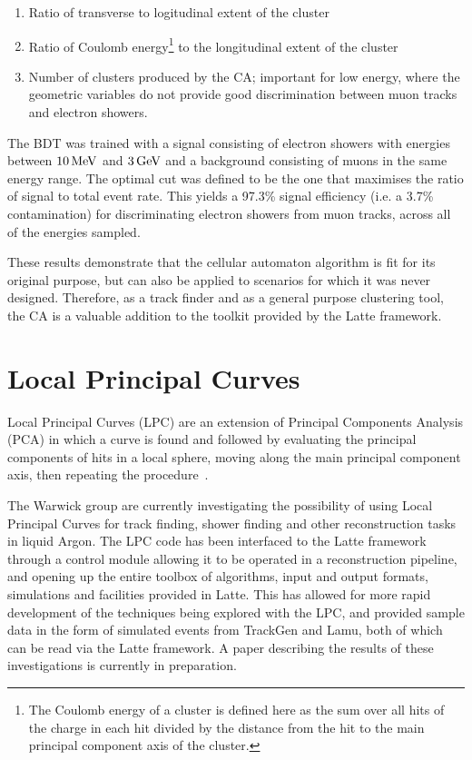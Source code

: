 \begin{enumerate}
    \item Ratio of transverse to logitudinal extent of the cluster
    \item Ratio of Coulomb energy\footnote{The Coulomb energy of a cluster is defined here as the sum over all hits of the charge in each hit divided by the distance from the hit to the main principal component axis of the cluster.} to the longitudinal extent of the cluster
    \item Number of clusters produced by the CA; important for low energy, where the geometric variables do not provide good discrimination between muon tracks and electron showers.
\end{enumerate}

The BDT was trained with a signal consisting of electron showers with energies between $10\,\mathrm{MeV}$ and $3\,\mathrm{GeV}$ and a background consisting of muons in the same energy range. The optimal cut was defined to be the one that maximises the ratio of signal to total event rate. This yields a 97.3\% signal efficiency (i.e. a 3.7\% contamination) for discriminating electron showers from muon tracks, across all of the energies sampled.

These results demonstrate that the cellular automaton algorithm is fit for its original purpose, but can also be applied to scenarios for which it was never designed. Therefore, as a track finder and as a general purpose clustering tool, the CA is a valuable addition to the toolkit provided by the Latte framework.

\section{Local Principal Curves}
Local Principal Curves (LPC) are an extension of Principal Components Analysis (PCA) in which a curve is found and followed by evaluating the principal components of hits in a local sphere, moving along the main principal component axis, then repeating the procedure~\citep{Einbeck2005}.

The Warwick group are currently investigating the possibility of using Local Principal Curves for track finding, shower finding and other reconstruction tasks in liquid Argon. The LPC code has been interfaced to the Latte framework through a control module allowing it to be operated in a reconstruction pipeline, and opening up the entire toolbox of algorithms, input and output formats, simulations and facilities provided in Latte. This has allowed for more rapid development of the techniques being explored with the LPC, and provided sample data in the form of simulated events from TrackGen and Lamu, both of which can be read via the Latte framework. A paper describing the results of these investigations is currently in preparation.

